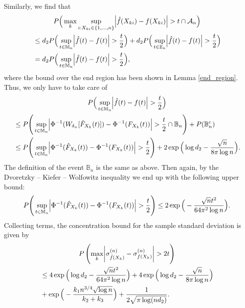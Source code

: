 Similarly, we find that
\begin{multline*}
    P\Big(\max_k \sup_{i: X_{ki} \in \{1,\dots,n\}} \abs{\hat{f}(X_{ki}) - f(X_{ki})} > t \cap \mathcal{A}_n \Big) \\
    \begin{aligned}
    &\leq d_2P\Big(\sup_{t \in \mathbb{M}_n} \abs{\hat{f}(t) - f(t)} > \frac{t}{2} \Big) + d_2 P\Big(\sup_{t \in \mathbb{E}_n} \abs{\hat{f}(t) - f(t)} > \frac{t}{2}\Big) \\
    &= d_2P\Big(\sup_{t \in \mathbb{M}_n} \abs{\hat{f}(t) - f(t)} > \frac{t}{2} \Big),
    \end{aligned}
\end{multline*}
where the bound over the end region has been shown in Lemma \ref{end_region}. Thus, we only have to take care of 
\begin{multline*}
    P\Big(\sup_{t \in \mathbb{M}_n} \abs{\hat{f}(t) - f(t)} > \frac{t}{2}\Big) \\
    \begin{aligned}
    &\leq P\Bigg(\sup_{t \in \mathbb{M}_n} \abs{\Phi^{-1}(W_{\delta_n}[\hat{F}_{X_k}(t)]) - \Phi^{-1}(F_{X_k}(t))} > \frac{t}{2} \cap \mathbb{B}_n\Bigg) + P(\mathbb{B}_n^c) \\
    &\leq P\Bigg(\sup_{t \in \mathbb{M}_n} \abs{\Phi^{-1}(\hat{F}_{X_k}(t)) - \Phi^{-1}(F_{X_k}(t))} > \frac{t}{2}\Bigg) + 2\exp\Big(\log d_2 - \frac{\sqrt{n}}{8\pi\log n}\Big).
    \end{aligned}
\end{multline*}
The definition of the event $\mathbb{B}_n$ is the same as above. Then again, by the Dvoretzky – Kiefer – Wolfowitz inequality we end up with the following upper bound:
\begin{equation*}
    P\Bigg(\sup_{t \in \mathbb{M}_n} \abs{\Phi^{-1}(\hat{F}_{X_k}(t)) - \Phi^{-1}(F_{X_k}(t))} > \frac{t}{2}\Bigg) \leq 2\exp\Big(-\frac{\sqrt{n}t^2}{64 \pi^2\log n}\Big).
\end{equation*}
Collecting terms, the concentration bound for the sample standard deviation is given by
\begin{multline*}
    P\left(\max_k \abs{\sigma^{(n)}_{\hat{f}(X_k)} - \sigma^{(n)}_{f(X_k)}} > 2t \right) \\
    \begin{aligned}
        &\leq 4\exp\Big(\log d_2 -\frac{\sqrt{n}t^2}{64 \pi^2\log n}\Big) +  4\exp\Big(\log d_2 - \frac{\sqrt{n}}{8\pi\log n}\Big) \\
        &+  \exp\Big(- \frac{k_1 n^{3/4} \sqrt{\log n}}{k_2+ k_3} \Big) + \frac{1}{2\sqrt{\pi \log(nd_2)}}.
    \end{aligned}
\end{multline*}

